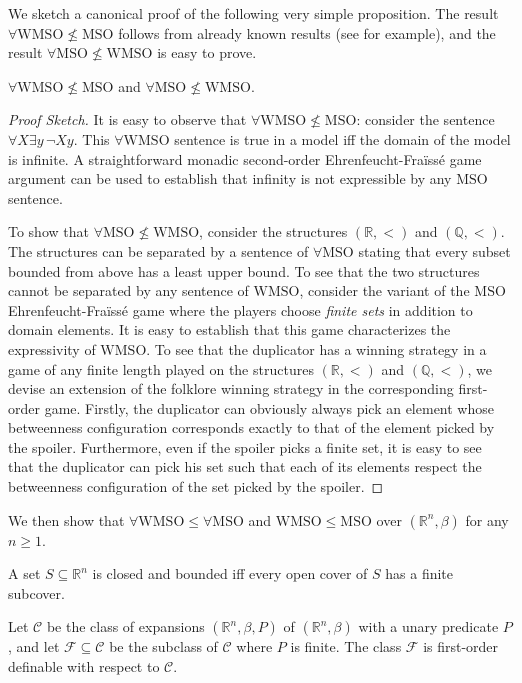 \documentclass{LMCS}
\theoremstyle{plain}
\newcommand{\rp}{(\mathbb{R}^n,\beta)}
\newcommand{\rpm}{\mathbb{R}^n,\beta}
\newcommand{\rsq}{\mathbb{R}^n}
\begin{document}
%
We sketch a canonical proof of the following very simple proposition. The result $\forall\mathrm{WMSO}\not\leq\mathrm{MSO}$
%
follows from already known results (see \cite{tenCate:2011} for example), and the result $\forall\mathrm{MSO}\not\leq\mathrm{WMSO}$ is easy to prove.
%
\begin{prop}\label{expressivityproposition}
%
$\forall\mathrm{WMSO}\not\leq\mathrm{MSO}$ and $\forall\mathrm{MSO}\not\leq\mathrm{WMSO}$.
%
\end{prop}
%
%
%
\begin{proof}[Proof Sketch]
%
It is easy to observe that $\forall\mathrm{WMSO}\not\leq\mathrm{MSO}$: consider the
%
sentence $\forall X\exists y\, \neg Xy$. This $\forall\mathrm{WMSO}$ sentence is
%
true in a model iff the domain of the model is infinite. A straightforward
%
monadic second-order Ehrenfeucht-Fra\"{i}ss\'{e} game
%
argument can be used to establish that
%
infinity is not expressible by any $\mathrm{MSO}$ sentence.
%



%
To show that $\forall\mathrm{MSO}\not\leq\mathrm{WMSO}$, consider the
%
structures $(\mathbb{R},<)$ and $(\mathbb{Q},<)$. The structures can be
%
separated by a sentence of $\forall\mathrm{MSO}$
%
stating that every subset bounded
%
from above has a least
%
upper bound. To see that the two structures cannot be
%
separated by any sentence of $\mathrm{WMSO}$, consider the
%
variant of the $\mathrm{MSO}$ Ehrenfeucht-Fra\"{i}ss\'{e} game
%
where the players choose \emph{finite sets} in
%
addition to domain elements. It is easy to establish
%
that this game characterizes the expressivity of $\mathrm{WMSO}$.
%
To see that the duplicator has a winning strategy in a game of any finite
%
length played on the
%
structures $(\mathbb{R},<)$ and $(\mathbb{Q},<)$, we
%
devise an extension of the folklore winning strategy in the 
%
corresponding first-order game. Firstly, the duplicator can obviously 
%
always pick an element whose  
%
betweenness configuration corresponds exactly to that of the element picked by the spoiler.
%
Furthermore, even if the spoiler picks a finite set,
%
it is easy to see that the duplicator can pick his set such that
%
each of its elements respect the betweenness
%
configuration of the set
%
picked by the spoiler.  
%
\end{proof}
We then show that $\forall\mathrm{WMSO}\leq\forall\mathrm{MSO}$ and $\mathrm{WMSO}\leq\mathrm{MSO}$ over $(\mathbb{R}^n,\beta)$
%
for any $n\geq 1$.
%
\begin{thm}
%
A set $S\subseteq\rsq$ is closed and bounded iff every open cover of $S$ has a
%
finite subcover. 
%
\end{thm}
%
\begin{thm}
%
\label{expressivitytheorem}
%
Let $\mathcal{C}$ be the class of expansions $(\rpm,P)$ of $\rp$ with a unary predicate $P$,
%
and let $\mathcal{F}\subseteq\mathcal{C}$ be the subclass of $\mathcal{C}$ where $P$ is finite.
%
The class $\mathcal{F}$ is first-order definable with respect to $\mathcal{C}$. 
%
\end{thm}
%
\end{document}
